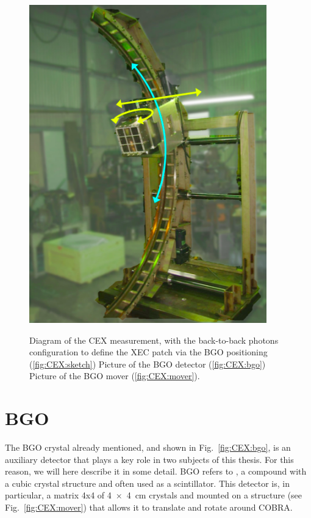 \begin{refsection}
\begin{figure}[ht]
{        \includegraphics[height=\h, keepaspectratio]{Figures/LH2/BGO_mover.png}\label{fig:CEX:mover}}
        \caption{Diagram of the CEX measurement, with the back-to-back photons configuration to define the XEC patch via the BGO positioning (\ref{fig:CEX:sketch}) Picture of the BGO detector (\ref{fig:CEX:bgo}) Picture of the BGO mover (\ref{fig:CEX:mover}).}
        \label{fig:CEX}
    \end{figure}

\section{BGO}
    The BGO crystal already mentioned, and shown in Fig.~\ref{fig:CEX:bgo}, is an auxiliary detector that plays a key role in two subjects of this thesis.
    For this reason, we will here describe it in some detail.
    BGO refers to , a compound with a cubic crystal structure and often used as a scintillator.
    This detector is, in particular, a matrix 4x4 of \SI{4x4}{cm} crystals and mounted on a structure (see Fig.~\ref{fig:CEX:mover}) that allows it to translate and rotate around COBRA.


\end{refsection}
